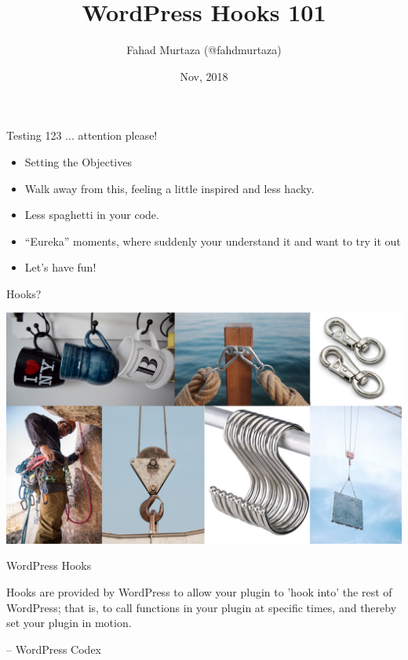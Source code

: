 \documentclass[10pt]{beamer}
\title{WordPress Hooks 101}
\date{Nov, 2018}
\author{Fahad Murtaza (@fahdmurtaza)}
\institute{WordCamp Islamabad, 2018}
\begin{document}
    \maketitle

    \begin{frame}{Testing 123 ... attention please!}
        \begin{itemize}
            \item Setting the Objectives
            \item Walk away from this, feeling a little inspired and less hacky.
            \item Less spaghetti in your code. 
            \item “Eureka” moments, where suddenly your understand it and want to try it out
            \item Let’s have fun!
        \end{itemize}
    \end{frame}

    \begin{frame}{Hooks?}
        \begin{center}
            \includegraphics[width=1\textwidth]{images/hooks}
        \end{center}
    \end{frame}

    \begin{frame}{WordPress Hooks}
        \begin{large}
            Hooks are provided by WordPress to allow your plugin to 'hook into' the rest of WordPress; that is, to call functions in your plugin at specific times, and thereby set your plugin in motion.   
        \end{large}
        \begin{flushright}
            -- WordPress Codex
        \end{flushright}
    \end{frame}
\end{document}
